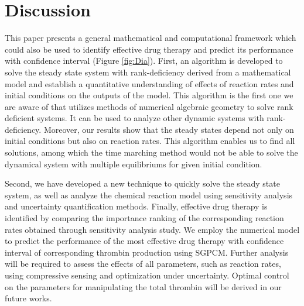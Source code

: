 \section*{Discussion}
\label{sec:conc} This paper presents a general mathematical and
computational framework which could also be used to identify effective drug therapy and
predict its performance with confidence interval (Figure
\ref{fig:Dia}).  First, an algorithm is developed to solve the
steady state system with rank-deficiency derived from a mathematical
model and establish a quantitative understanding of effects of
 reaction rates and initial conditions on the outputs of the model. This algorithm  is the first one we are aware
of that utilizes methods of numerical algebraic geometry to solve
rank deficient systems. It can be used to analyze other dynamic
systems with rank-deficiency. Moreover, our results show that the
steady states depend not only on initial conditions but also on
reaction rates. This algorithm enables us to find all solutions,
among which the time marching method would not be able to solve the
dynamical system with multiple equilibriums for given initial
condition.

Second, we have developed a new technique to quickly solve
the steady state system, as well as analyze the chemical reaction
model using sensitivity analysis and uncertainty quantification methods. 
Finally, effective drug therapy
is identified by comparing the importance ranking of the
corresponding reaction rates obtained through sensitivity analysis
study. We employ the numerical model to predict the performance of
the most effective drug therapy with confidence interval of
corresponding thrombin production using SGPCM. Further analysis will
be required to assess the effects of all parameters, such as
reaction rates, using compressive sensing and optimization under
uncertainty. Optimal control on the parameters for manipulating the
total thrombin will be derived in our future works.


